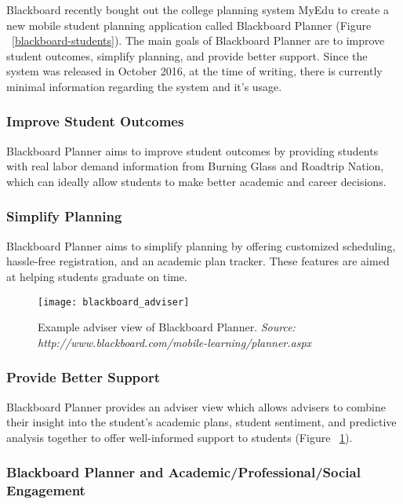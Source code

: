 Blackboard recently bought out the college planning system MyEdu to create a new mobile student planning application called Blackboard Planner \cite{Blackboard} (Figure ~\ref{blackboard-students}). The main goals of Blackboard Planner are to improve student outcomes, simplify planning, and provide better support. Since the system was released in October 2016, at the time of writing, there is currently minimal information regarding the system and it's usage.

\subsubsection{Improve Student Outcomes}

Blackboard Planner aims to improve student outcomes by providing students with real labor demand information from Burning Glass and Roadtrip Nation, which can ideally allow students to make better academic and career decisions.

\subsubsection{Simplify Planning}

Blackboard Planner aims to simplify planning by offering customized scheduling, hassle-free registration, and an academic plan tracker. These features are aimed at helping students graduate on time.

\begin{figure}[h]
\centering
\texttt{[image: blackboard\_adviser]}
\caption{Example adviser view of Blackboard Planner. \textit{Source: http://www.blackboard.com/mobile-learning/planner.aspx}}
\label{blackboard-advisor}
\end{figure}

\subsubsection{Provide Better Support}

Blackboard Planner provides an adviser view which allows advisers to combine their insight into the student's academic plans, student sentiment, and predictive analysis together to offer well-informed support to students (Figure ~\ref{blackboard-advisor}). 

\subsubsection{Blackboard Planner and Academic/Professional/Social Engagement}

